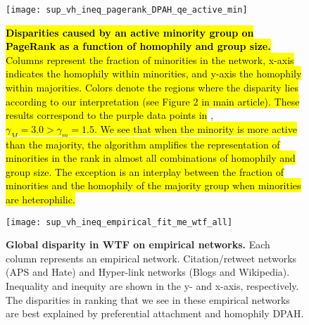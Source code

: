 \documentclass[fleqn,10pt]{wlscirep}
\begin{document}
\begin{figure}[h!]
    \centering
    \texttt{[image: sup\_vh\_ineq\_pagerank\_DPAH\_qe\_active\_min]}
    \caption{\hl{\textbf{Disparities caused by an active minority group on PageRank as a function of homophily and group size.} Columns represent the fraction of minorities in the network, x-axis indicates the homophily within minorities, and y-axis the homophily within majorities. 
    Colors denote the regions where the disparity lies according to our interpretation (see Figure 2 in main article).
    These results correspond to the purple data points in} , \hl{$\gamma_M=3.0 > \gamma_m=1.5$. We see that when the minority is more active than the majority, the algorithm amplifies the representation of minorities in the rank in almost all combinations of homophily and group size. The exception is an interplay between the fraction of minorities and the homophily of the majority group when minorities are heterophilic.}}
    \label{sm:vh_pagerank_DBAH_active_min}
\end{figure}

\begin{figure}[h!]
    \centering
    \texttt{[image: sup\_vh\_ineq\_empirical\_fit\_me\_wtf\_all]}
    \caption{\textbf{Global disparity in WTF on empirical networks.} Each column represents an empirical network. Citation/retweet networks (APS and Hate) and Hyper-link networks (Blogs and Wikipedia). Inequality and inequity are shown in the y- and x-axis, respectively. The disparities in ranking that we see in these empirical networks are best explained by preferential attachment and homophily {DPAH}.}
    \label{sm:empirical}
\end{figure}
\end{document}
